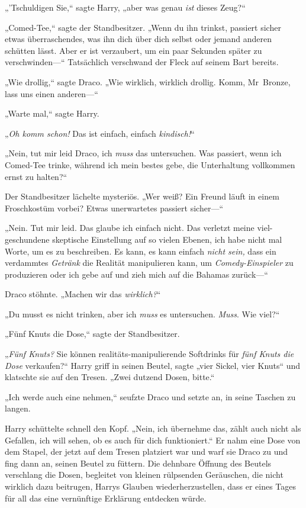 {„'Tschuldigen Sie,“ sagte Harry, „aber was genau \emph{ist} dieses Zeug?“

„Comed-Tee,“ sagte der Standbesitzer. „Wenn du ihn trinkst, passiert sicher etwas überraschendes, was ihn dich über dich selbst oder jemand anderen schütten lässt. Aber er ist verzaubert, um ein paar Sekunden später zu verschwinden—“ Tatsächlich verschwand der Fleck auf seinem Bart bereits.

„Wie drollig,“ sagte Draco. „Wie wirklich, wirklich drollig. Komm, Mr~Bronze, lass uns einen anderen—“

„Warte mal,“ sagte Harry.

„\emph{Oh komm schon!} Das ist einfach, einfach \emph{kindisch!}“

„Nein, tut mir leid Draco, ich \emph{muss} das untersuchen. Was passiert, wenn ich Comed-Tee trinke, während ich mein bestes gebe, die Unterhaltung vollkommen ernst zu halten?“

Der Standbesitzer lächelte mysteriös. „Wer weiß? Ein Freund läuft in einem Froschkostüm vorbei? Etwas unerwartetes passiert sicher—“

„Nein. Tut mir leid. Das glaube ich einfach nicht. Das verletzt meine viel-geschundene skeptische Einstellung auf so vielen Ebenen, ich habe nicht mal Worte, um es zu beschreiben. Es kann, es kann einfach \emph{nicht sein,} dass ein verdammtes \emph{Getränk} die Realität manipulieren kann, um \emph{Comedy-Einspieler} zu produzieren oder ich gebe auf und zieh mich auf die Bahamas zurück—“

Draco stöhnte. „Machen wir das \emph{wirklich?}“

„Du musst es nicht trinken, aber ich \emph{muss} es untersuchen. \emph{Muss}. Wie viel?“

„Fünf Knuts die Dose,“ sagte der Standbesitzer.

„\emph{Fünf Knuts?} Sie können realitäts-manipulierende Softdrinks für \emph{fünf Knuts die Dose} verkaufen?“ Harry griff in seinen Beutel, sagte „vier Sickel, vier Knuts“ und klatschte sie auf den Tresen. „Zwei dutzend Dosen, bitte.“

„Ich werde auch eine nehmen,“ seufzte Draco und setzte an, in seine Taschen zu langen.

Harry schüttelte schnell den Kopf. „Nein, ich übernehme das, zählt auch nicht als Gefallen, ich will sehen, ob es auch für dich funktioniert.“ Er nahm eine Dose von dem Stapel, der jetzt auf dem Tresen platziert war und warf sie Draco zu und fing dann an, seinen Beutel zu füttern. Die dehnbare Öffnung des Beutels verschlang die Dosen, begleitet von kleinen rülpsenden Geräuschen, die nicht wirklich dazu beitrugen, Harrys Glauben wiederherzustellen, dass er eines Tages für all das eine vernünftige Erklärung entdecken würde.

}
